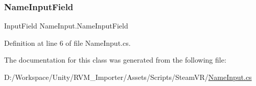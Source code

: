 \subsubsection{\texorpdfstring{NameInputField}{NameInputField}}
{\footnotesize\ttfamily Input\+Field Name\+Input.\+Name\+Input\+Field}



Definition at line 6 of file Name\+Input.\+cs.



The documentation for this class was generated from the following file\+:\begin{DoxyCompactItemize}
\item 
D\+:/\+Workspace/\+Unity/\+R\+V\+M\+\_\+\+Importer/\+Assets/\+Scripts/\+Steam\+V\+R/\mbox{\hyperlink{_name_input_8cs}{Name\+Input.\+cs}}\end{DoxyCompactItemize}
